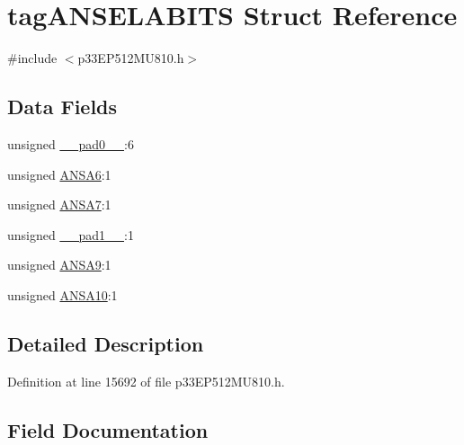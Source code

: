 \hypertarget{structtag_a_n_s_e_l_a_b_i_t_s}{}\section{tag\+A\+N\+S\+E\+L\+A\+B\+I\+TS Struct Reference}
\label{structtag_a_n_s_e_l_a_b_i_t_s}


{\ttfamily \#include $<$p33\+E\+P512\+M\+U810.\+h$>$}

\subsection*{Data Fields}
\begin{DoxyCompactItemize}
\item 
unsigned \hyperlink{structtag_a_n_s_e_l_a_b_i_t_s_adf71f3d8410c1f1dbbc96680a92c49af}{\+\_\+\+\_\+pad0\+\_\+\+\_\+}\+:6
\item 
unsigned \hyperlink{structtag_a_n_s_e_l_a_b_i_t_s_a7d7d422c55b16521b56c04976d909fe0}{A\+N\+S\+A6}\+:1
\item 
unsigned \hyperlink{structtag_a_n_s_e_l_a_b_i_t_s_ac1c3315a8d696abff89feb403b9f1005}{A\+N\+S\+A7}\+:1
\item 
unsigned \hyperlink{structtag_a_n_s_e_l_a_b_i_t_s_acaf2d0924a107ec6e8d2e31febaf66f9}{\+\_\+\+\_\+pad1\+\_\+\+\_\+}\+:1
\item 
unsigned \hyperlink{structtag_a_n_s_e_l_a_b_i_t_s_a653c3dbc978d1f958e63563543779e37}{A\+N\+S\+A9}\+:1
\item 
unsigned \hyperlink{structtag_a_n_s_e_l_a_b_i_t_s_a6c4613c498aae74c23744a905a7d22b5}{A\+N\+S\+A10}\+:1
\end{DoxyCompactItemize}


\subsection{Detailed Description}


Definition at line 15692 of file p33\+E\+P512\+M\+U810.\+h.



\subsection{Field Documentation}
\mbox{\label{structtag_a_n_s_e_l_a_b_i_t_s_adf71f3d8410c1f1dbbc96680a92c49af}} 

